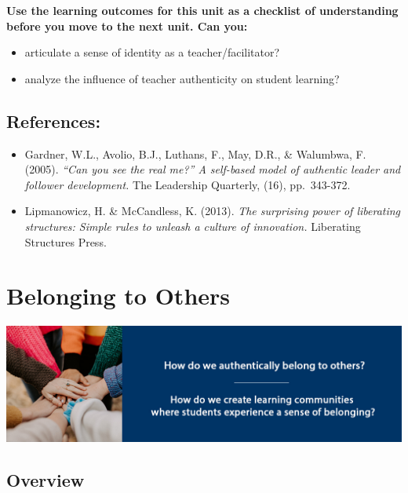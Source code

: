 \documentclass[
]{book}
\providecommand{\tightlist}{%
  \setlength{\itemsep}{0pt}\setlength{\parskip}{0pt}}
\begin{document}
\begin{progress}
\textbf{Use the learning outcomes for this unit as a checklist of understanding before you move to the next unit. Can you:}

\begin{itemize}
\tightlist
\item
  articulate a sense of identity as a teacher/facilitator?
\item
  analyze the influence of teacher authenticity on student learning?
\end{itemize}
\end{progress}

\hypertarget{references}{%
\section*{References:}\label{references}}

\begin{itemize}
\tightlist
\item
  Gardner, W.L., Avolio, B.J., Luthans, F., May, D.R., \& Walumbwa, F. (2005). \emph{``Can you see the real me?'' A self-based model of authentic leader and follower development.} The Leadership Quarterly, (16), pp.~343-372.\\
\item
  Lipmanowicz, H. \& McCandless, K. (2013). \emph{The surprising power of liberating structures: Simple rules to unleash a culture of innovation.} Liberating Structures Press.
\end{itemize}

\hypertarget{belonging-to-others}{%
\chapter{Belonging to Others}\label{belonging-to-others}}

\includegraphics{assets/unit3/LDRS664-BannerUnit3.jpg}

\hypertarget{overview-2}{%
\section*{Overview}\label{overview-2}}
\end{document}
